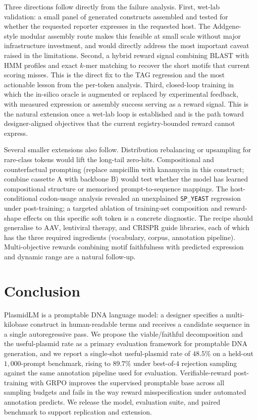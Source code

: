 \documentclass{article}
\begin{document}
Three directions follow directly from the failure analysis. First, wet-lab validation:
a small panel of generated constructs assembled and tested for whether the requested
reporter expresses in the requested host. The Addgene-style modular assembly route
makes this feasible at small scale without major infrastructure investment, and would
directly address the most important caveat raised in the limitations. Second, a hybrid
reward signal combining BLAST with HMM profiles and exact $k$-mer matching to recover
the short motifs that current scoring misses. This is the direct fix to the TAG
regression and the most actionable lesson from the per-token analysis. Third,
closed-loop training in which the in-silico oracle is augmented or replaced by
experimental feedback, with measured expression or assembly success serving as a reward
signal. This is the natural extension once a wet-lab loop is established and is the
path toward designer-aligned objectives that the current registry-bounded reward
cannot express.

Several smaller extensions also follow. Distribution rebalancing or upsampling for
rare-class tokens would lift the long-tail zero-hits. Compositional and counterfactual
prompting (replace ampicillin with kanamycin in this construct; combine cassette A with
backbone B) would test whether the model has learned compositional structure or
memorised prompt-to-sequence mappings. The host-conditional codon-usage analysis
revealed an unexplained \texttt{SP\_YEAST} regression under post-training; a targeted
ablation of training-set composition and reward-shape effects on this specific soft
token is a concrete diagnostic. The recipe should generalise to AAV, lentiviral
therapy, and CRISPR guide libraries, each of which has the three required ingredients
(vocabulary, corpus, annotation pipeline). Multi-objective rewards combining motif
faithfulness with predicted expression and dynamic range are a natural follow-up.

\section{Conclusion}

PlasmidLM is a promptable DNA language model: a designer specifies a multi-kilobase
construct in human-readable terms and receives a candidate sequence in a single
autoregressive pass. We propose the viable/faithful decomposition and the
useful-plasmid rate as a primary evaluation framework for promptable DNA generation, and
we report a single-shot useful-plasmid rate of $48.5\%$ on a held-out
$1{,}000$-prompt benchmark, rising to $89.7\%$ under best-of-$4$ rejection sampling
against the same annotation pipeline used for evaluation. Verifiable-reward
post-training with GRPO improves the supervised promptable base across all sampling
budgets and fails in the way reward misspecification under automated annotation
predicts. We release the model, evaluation suite, and paired benchmark to support
replication and extension.
\end{document}
